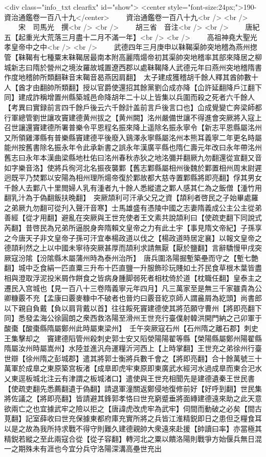 <div class="info_txt clearfix" id="show">
<center style="font-size:24px;">190-資治通鑑卷一百八十九</center>
  　　資治通鑑卷一百八十九<br />
<br />
　　宋　司馬光　撰<br />
<br />
　　胡三省　音注<br />
<br />
　　唐紀五【起重光大荒落三月盡十二月不滿一年】<br />
<br />
　　高祖神堯大聖光孝皇帝中之中<br />
<br />
　　武德四年三月庚申以靺鞨渠帥突地稽為燕州揔管【靺鞨有七種粟末靺鞨居最南本附高麗隋煬帝初其渠帥突地稽率其部來降居之柳城新志曰隋於營州之境汝羅故城置遼西郡以處靺鞨降人武德元年曰燕州突地稽隋書作度地稽帥所類翻靺音末鞨音曷燕因肩翻】　太子建成獲稽胡千餘人釋其酋帥數十人【酋才由翻帥所類翻】授以官爵使還招其餘黨劉仚成亦降【仚許延翻降戶江翻下同】建成詐稱增置州縣築城邑命降胡年二十以上皆集以兵圍而殺之死者六千餘人　【考異曰實録前言四千餘戶後云六千餘計盖前言戶後言口也】仚成覺變亡奔梁師都　行軍總管劉世讓攻竇建德黄州拔之【黄州闕】洺州嚴備世讓不得進會突厥將入寇上召世讓還竇建德所署普樂令平恩程名振來降上遥除名振永寧令【新志平恩縣屬洺州又所領雞澤縣有普樂縣竇建德平後廢入鷄澤永寧縣屬洺州本熊耳義寧二年更名時屬能州按舊書除名振永年令此承新書之誤永年漢廣平縣也隋仁壽元年改曰永年帶洺州舊志曰永年本漢曲梁縣地杜佑曰洺州春秋赤狄之地洺彌并翻厥九勿翻還從宣翻又音如字樂音洛】使將兵徇河北名振夜襲鄴【舊志鄴縣屬相州後魏於鄴置相州周末尉遲迥既平乃焚鄴以安陽為相州理所煬帝復於鄴故都大慈寺置鄴縣將即亮翻】俘其男女千餘人去鄴八十里閲婦人乳有湩者九十餘人悉縱遣之鄴人感其仁為之飯僧【湩竹用翻乳汁為于偽翻飯扶晩翻】　突厥頡利可汗承父兄之資【頡利者啓民之子始畢處羅之弟厥九勿翻可從刋入聲汗音寒】士馬雄盛有憑陵中國之志妻隋義成公主公主從弟善經【從才用翻】避亂在突厥與王世充使者王文素共說頡利曰【使疏吏翻下同說式芮翻】昔啓民為兄弟所逼脱身奔隋賴文皇帝之力有此土宇【事見隋文帝紀】子孫享之今唐天子非文皇帝子孫可汗宜奉楊政道以伐之【楊政道時居定襄】以報文皇帝之德頡利然之上以中國未寧待突厥甚厚而頡利求請無厭【厭於鹽翻】言辭驕慢甲戌突厥寇汾隂【汾隂縣木屬蒲州時為泰州治所】　唐兵圍洛陽掘塹築壘而守之【塹七艶翻】城中乏食絹一匹直粟三升布十匹直鹽一升服飾珍玩賤如土芥民食草根木葉皆盡相與澄取浮泥投米屑作餅食之皆病身腫脚弱死者相枕倚於道【枕職任翻】皇泰主之遷民入宫城也【見一百八十三卷隋義寧元年四月】凡三萬家至是無三千家雖貴為公卿糠覈不充【孟康曰覈麥糠中不破者也晉灼曰覈音紇京師人謂麄屑為紇頭】尚書郎以下親自負戴【負以肩背戴以首】往往餒死竇建德使其將范願守曹州【將即亮翻下同】悉發孟海公徐圓朗之衆西救洛陽至滑州王世充行臺僕射韓洪開門納之己卯軍于酸棗【酸棗縣隋屬鄭州此時屬東梁州】　壬午突厥寇石州【石州隋之離石郡】刺史王集擊却之　竇建德䧟管州殺刺史郭士安又䧟滎陽陽翟等縣【榮陽縣屬鄭州陽翟縣隋屬汝州時屬嵩州】水陸並進汎舟運糧沂河西上【上時掌翻】王世充之弟徐州行臺世辯【徐州隋之彭城郡】遣其將郭士衡將兵數千會之【將即亮翻】合十餘萬號三十萬軍於成臯之東原築宫板渚【成臯即虎牢東原即東廣武水經河水過成臯而東合汜水乂東逕板城北注云有津謂之板城渚口】遣使與王世充相聞先是建德遺秦王世民書【使疏吏翻先悉薦翻遺于偽翻】請退軍潼關返鄭侵地復修前好【好呼到翻】世民集將佐議之【將即亮翻】皆請避其鋒郭孝恪曰世充窮蹙垂將面縳建德遠來助之此天意欲兩亡之也宜據武牢之險以拒之【唐諱虎改虎牢為武牢】伺間而動破之必矣【間古莧翻】記室薛收曰世充保據東都府庫充實所將之兵皆江淮精鋭即日之患但乏糧食耳以是之故為我所持求戰不得守則難久建德親帥大衆遠來赴援【帥讀曰率】亦當極其精鋭若縱之至此兩寇合從【從子容翻】轉河北之粟以饋洛陽則戰爭方始偃兵無日混一之期殊未有涯也今宜分兵守洛陽深溝高壘世充出